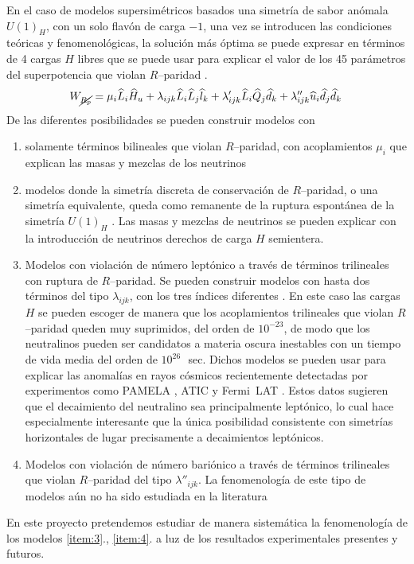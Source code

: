 \documentclass[11pt]{article}
\begin{document}
En el caso de modelos supersimétricos basados una simetría de sabor anómala $U(1)_H$, con un solo flavón de carga $-1$, una vez se introducen las condiciones teóricas y fenomenológicas, la solución más óptima se puede expresar en términos de 4 cargas $H$ libres que se puede usar para explicar el valor de los 45 parámetros del superpotencia que violan $R$--paridad \cite{Mira:2000gg,Dreiner:2003hw,Dreiner:2003yr,Dreiner:2007vp,Dreiner:2006xw,Sierra:2009zq}.
\begin{equation}
  \label{eq:5}
  W_{\cancel{R_p}} = \mu_i\widehat{L}_i\widehat{H}_u +
  \lambda_{i j k}\widehat{L}_i\widehat{L}_j\widehat{l}_k +
  \lambda'_{i j k}\widehat{L}_i\widehat{Q}_j\widehat{d}_k +
  \lambda''_{ijk}\widehat{u}_i\widehat{d}_j\widehat{d}_k\,
\end{equation}
De las diferentes posibilidades se pueden construir modelos con
\begin{enumerate}
\item solamente términos bilineales que violan $R$--paridad, con acoplamientos $\mu_i$ que explican las masas y mezclas de los neutrinos \cite{Mira:2000gg,Dreiner:2003hw,Dreiner:2006xw}
\label{item:1}
\item modelos donde la simetría discreta de conservación de $R$--paridad, o una simetría equivalente, queda como remanente de la ruptura espontánea de la simetría $U(1)_H$ \cite{Dreiner:2003hw,Dreiner:2003yr,Dreiner:2007vp}. Las masas y mezclas de neutrinos se pueden explicar con la introducción de neutrinos derechos de carga $H$ semientera.
\label{item:2}
\item Modelos con violación de número leptónico a través de términos trilineales con ruptura de $R$--paridad. Se pueden construir modelos con hasta dos términos del tipo $\lambda_{ijk}$, con los tres índices diferentes \cite{Sierra:2009zq}.  En este caso las cargas $H$ se pueden escoger de manera que los acoplamientos trilineales que violan $R$--paridad queden muy suprimidos, del orden de $10^{-23}$, de modo que los neutralinos pueden ser  candidatos a materia oscura inestables con un tiempo de vida media del orden de $10^{26}\,$~sec. Dichos modelos se pueden usar para explicar las anomalías en rayos cósmicos \cite{Sierra:2009zq} recientemente detectadas por experimentos como PAMELA \cite{Adriani:2008zr}, ATIC \cite{:2008zzr} y Fermi~LAT \cite{Abdo:2009zk}. Estos datos sugieren que el decaimiento del neutralino sea principalmente leptónico, lo cual hace especialmente interesante que la única posibilidad consistente con simetrías horizontales de lugar precisamente a decaimientos leptónicos.
\label{item:3}
\item Modelos con violación de número bariónico a través de términos trilineales que violan $R$--paridad del tipo $\lambda''_{ijk}$. La fenomenología de este tipo de modelos aún no ha sido estudiada en la literatura
\label{item:4}
\end{enumerate}
En este proyecto pretendemos estudiar de manera sistemática la fenomenología de los modelos \ref{item:3}., \ref{item:4}. a luz de los resultados experimentales presentes y futuros.
\end{document}
